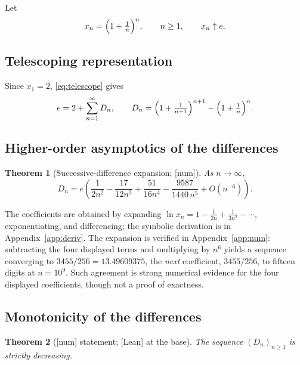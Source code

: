 \documentclass[11pt]{article}
\theoremstyle{plain}
\newtheorem{theorem}{Theorem}
\theoremstyle{remark}
\begin{document}
Let
\begin{equation}
  x_n = \Bigl(1 + \tfrac1n\Bigr)^{n}, \qquad n \ge 1, \qquad x_n \uparrow e .
  \label{eq:xn}
\end{equation}

\subsection{Telescoping representation}
Since $x_1 = 2$, \eqref{eq:telescope} gives
\begin{equation}
  e = 2 + \sum_{n=1}^{\infty} D_n, \qquad
  D_n = \Bigl(1+\tfrac1{n+1}\Bigr)^{n+1} - \Bigl(1+\tfrac1n\Bigr)^{n}.
  \label{eq:e-telescope}
\end{equation}

\subsection{Higher-order asymptotics of the differences}
\begin{theorem}[Successive-difference expansion; \textsf{[num]}]
\label{thm:e}
As $n\to\infty$,
\begin{equation}
  D_n = e\left(\frac{1}{2n^{2}} - \frac{17}{12n^{3}} + \frac{51}{16n^{4}}
             - \frac{9587}{1440\,n^{5}} + O(n^{-6})\right).
  \label{eq:e-expansion}
\end{equation}
\end{theorem}

The coefficients are obtained by expanding $\ln x_n = 1 - \tfrac1{2n} +
\tfrac1{3n^2} - \cdots$, exponentiating, and differencing; the symbolic
derivation is in Appendix~\ref{app:deriv}. The expansion is verified in
Appendix~\ref{app:num}: subtracting the four displayed terms and multiplying by
$n^{6}$ yields a sequence converging to $3455/256 = 13.49609375$, the
\emph{next} coefficient, $3455/256$, to fifteen digits at $n = 10^{9}$. Such
agreement is strong numerical evidence for the four displayed coefficients,
though not a proof of exactness.

\subsection{Monotonicity of the differences}
\begin{theorem}[\textsf{[num]} statement; \textsf{[Lean]} at the base]
\label{thm:mono}
The sequence $(D_n)_{n\ge1}$ is strictly decreasing.
\end{theorem}
\end{document}
